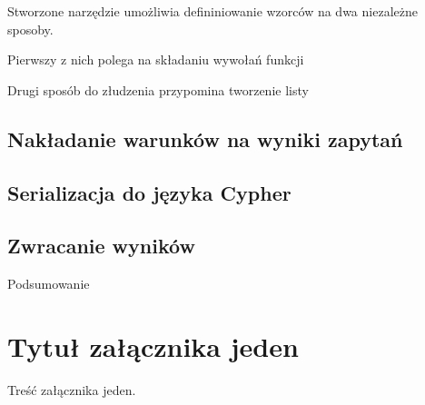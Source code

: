 \documentclass[brudnopis]{xmgr}
\begin{document}
Stworzone narzędzie umożliwia defininiowanie wzorców na dwa niezależne sposoby.

Pierwszy z nich polega na składaniu wywołań funkcji


Drugi sposób do złudzenia przypomina tworzenie listy 


\section{Nakładanie warunków na wyniki zapytań}

\section{Serializacja do języka Cypher}

\section{Zwracanie wyników}

\summary
Podsumowanie

\appendix
\chapter{Tytuł załącznika jeden}

Treść załącznika jeden.




\listoftables

\listoffigures

\oswiadczenie
\end{document}
